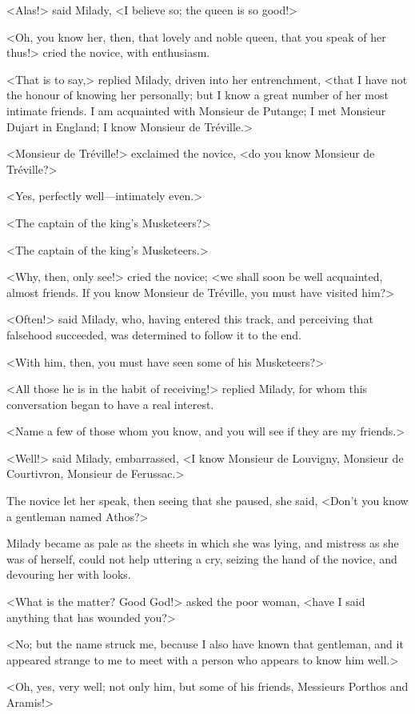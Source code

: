 <Alas!> said Milady, <I believe so; the queen is so good!> 

<Oh, you know her, then, that lovely and noble queen, that you speak of her thus!> cried the novice, with enthusiasm. 

<That is to say,> replied Milady, driven into her entrenchment, <that I have not the honour of knowing her personally; but I know a great number of her most intimate friends. I am acquainted with Monsieur de Putange; I met Monsieur Dujart in England; I know Monsieur de Tréville.> 

<Monsieur de Tréville!> exclaimed the novice, <do you know Monsieur de Tréville?> 

<Yes, perfectly well---intimately even.> 

<The captain of the king's Musketeers?> 

<The captain of the king's Musketeers.> 

<Why, then, only see!> cried the novice; <we shall soon be well acquainted, almost friends. If you know Monsieur de Tréville, you must have visited him?> 

<Often!> said Milady, who, having entered this track, and perceiving that falsehood succeeded, was determined to follow it to the end. 

<With him, then, you must have seen some of his Musketeers?> 

<All those he is in the habit of receiving!> replied Milady, for whom this conversation began to have a real interest. 

<Name a few of those whom you know, and you will see if they are my friends.> 

<Well!> said Milady, embarrassed, <I know Monsieur de Louvigny, Monsieur de Courtivron, Monsieur de Ferussac.> 

The novice let her speak, then seeing that she paused, she said, <Don't you know a gentleman named Athos?> 

Milady became as pale as the sheets in which she was lying, and mistress as she was of herself, could not help uttering a cry, seizing the hand of the novice, and devouring her with looks. 

<What is the matter? Good God!> asked the poor woman, <have I said anything that has wounded you?> 

<No; but the name struck me, because I also have known that gentleman, and it appeared strange to me to meet with a person who appears to know him well.> 

<Oh, yes, very well; not only him, but some of his friends, Messieurs Porthos and Aramis!> 

